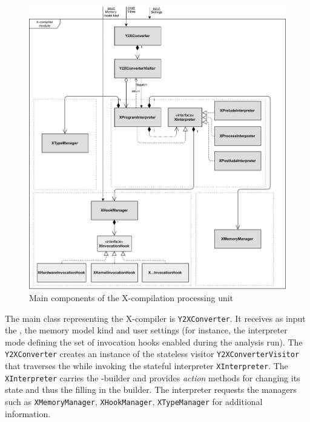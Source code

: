 \begin{figure}[!t]%
    \centering
  \includegraphics[max width=\textwidth,keepaspectratio]{img/my/draw.io/X-compiler.png}
  \caption{Main components of the X-compilation processing unit}
  \label{fig:compiler}
\end{figure}

The main class representing the X-compiler is \texttt{Y2XConverter}. %
It receives as input the \ytree{}, the memory model kind and user settings (for instance, the interpreter mode defining the set of invocation hooks enabled during the analysis run).
The \texttt{Y2XConverter} creates an instance of the stateless visitor \texttt{Y2XConverterVisitor} that traverses the \ytree{} while invoking the stateful interpreter \texttt{XInterpreter}.
The \texttt{XInterpreter} carries the \xgraph{}-builder and provides \textit{action} methods for changing its state and thus the filling in the builder.
The interpreter requests the managers such as \texttt{XMemoryManager}, \texttt{XHookManager}, \texttt{XTypeManager} for additional information. 

